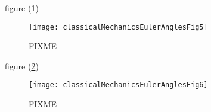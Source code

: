 figure (\ref{fig:classicalMechanicsEulerAngles:classicalMechanicsEulerAnglesFig5})
\begin{figure}[htp]
   \centering
   \texttt{[image: classicalMechanicsEulerAnglesFig5]}
   \caption{FIXME}\label{fig:classicalMechanicsEulerAngles:classicalMechanicsEulerAnglesFig5}
\end{figure}
figure (\ref{fig:classicalMechanicsEulerAngles:classicalMechanicsEulerAnglesFig6})
\begin{figure}[htp]
   \centering
   \texttt{[image: classicalMechanicsEulerAnglesFig6]}
   \caption{FIXME}\label{fig:classicalMechanicsEulerAngles:classicalMechanicsEulerAnglesFig6}
\end{figure}

\EndNoBibArticle
